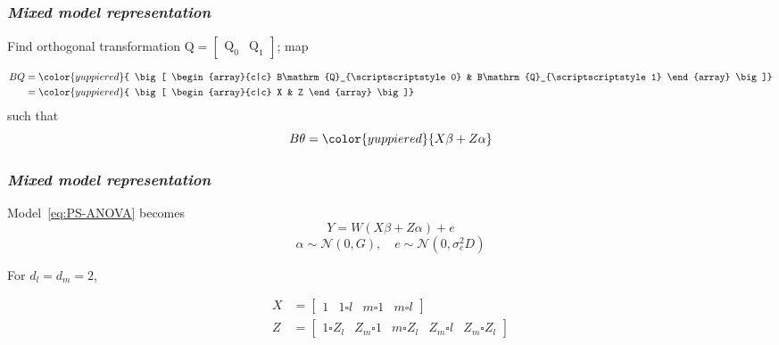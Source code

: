 \documentclass[12pt]{beamer}
\newcommand{\newmaththought}[1]{{ \color{foreground} {#1}}}
\newcommand{\mixedmodelmath}[1]{{ \color{yuppiered} {#1}}}
\newcommand{\ms}{\scriptscriptstyle}
\begin{document}
\begin{frame}
\frametitle{\emph{Mixed model representation}}

Find orthogonal transformation $\mathrm{Q} = \left[\begin{array}{c|c} \mathrm{Q}_0 & \mathrm{Q}_1 \end{array}\right]$; map

\begin{align*}
BQ &=\mixedmodelmath{ \big[ \begin{array}{c|c} B\mathrm{Q}_{\ms 0} &  B\mathrm{Q}_{\ms 1} \end{array}  \big]}	\\	
&=  \mixedmodelmath{ \big[ \begin{array}{c|c} X & Z \end{array}  \big]}\\
\end{align*}
\noindent
such that
\begin{equation*}
B\theta = \mixedmodelmath{X\beta + Z\alpha}
\end{equation*}

\end{frame}







\begin{frame}
\frametitle{\emph{Mixed model representation}}


Model~\ref{eq:PS-ANOVA} becomes
\begin{equation} \label{eq:vc-mixed-effects-model}
Y = W\left(X \beta + Z \alpha\right) + e 
\end{equation}
\begin{equation*}
 \alpha \sim \mathcal{N}\left(0,G \right), \quad
 e\sim\mathcal{N}\left(0, \sigma_{\ms e}^2 D \right)
\end{equation*}

For $d_{\ms l} = d_{\ms m} = 2$, 

\begin{align*} 
X &= \left[\begin{array}{c|c|c|c} 1 & 1 \square l & m \square 1 & m \square l  \end{array} \right] \\
Z &= \left[\begin{array}{c|c|c|c|c} 1 \square Z_{\ms l}& Z_{\ms m} \square 1 & m \square  Z_{\ms l} &  Z_{\ms m} \square l &  Z_{\ms m} \square  Z_{\ms l}\end{array} \right] 
\end{align*} 

\end{frame}
\end{document}
